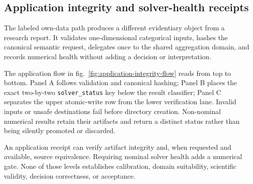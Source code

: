 \documentclass[
  english,
]{article}
\theoremstyle{plain}
\theoremstyle{definition}
\theoremstyle{remark}
\theoremstyle{definition}
\begin{document}
\subsection{Application integrity and solver-health
receipts}\label{sec:repro-application-integrity}

The labeled own-data path produces a different evidentiary object from a
research report. It validates one-dimensional categorical inputs, hashes
the canonical semantic request, delegates once to the shared aggregation
domain, and records numerical health without adding a decision or
interpretation.

The application flow in fig.~\ref{fig:application-integrity-flow} reads
from top to bottom. Panel A follows validation and canonical hashing;
Panel B places the exact two-by-two \texttt{solver\_status} key below
the result classifier; Panel C separates the upper atomic-write row from
the lower verification lane. Invalid inputs or unsafe destinations fail
before directory creation. Non-nominal numerical results retain their
artifacts and return a distinct status rather than being silently
promoted or discarded.

An application receipt can verify artifact integrity and, when requested
and available, source equivalence. Requiring nominal solver health adds
a numerical gate. None of those levels establishes calibration, domain
suitability, scientific validity, decision correctness, or acceptance.
\end{document}
